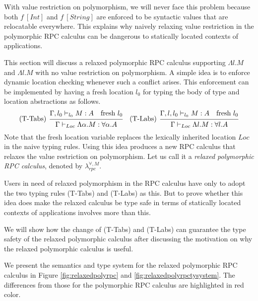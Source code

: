 \documentclass[a4paper]{article}
\theoremstyle{plain}
\theoremstyle{definition}
\newcommand{\polyrpcM}{$\lambda_{rpc}^{\forall,M}$\xspace}
\newcommand{\tyenv}{\Gamma}
\newcommand{\tyenvExtWith}[1]{\Gamma,#1}
\newcommand{\typing}[4]{#1\vdash_{#2} #3 : #4}
\newcommand{\Loc}{Loc}
\begin{document}
%
With value restriction on polymorphism, we will never face this
problem because both $f \ [Int]$ and $f \ [String]$ are enforced to be
syntactic values that are relocatable everywhere.
%
This explains why naively relaxing value restriction in the
polymorphic RPC calculus can be dangerous to statically located
contexts of applications.


%
This section will discuss a relaxed polymorphic RPC calculus
supporting $\Lambda l.M$ and $\Lambda l.M$ with no value restriction
on polymorphism.
%
A simple idea is to enforce dynamic location checking whenever such a
conflict arises.
%
This enforcement can be implemented by having a fresh location $l_0$
for typing the body of type and location abstractions as follows.
%
\[
    \begin{prooftree}
      \hypo{  \typing{\tyenv,l_0}{l_0}{M}{A} \ \ \ \mbox{fresh} \ l_0}
      \infer[left label=(T-Tabs)]1{ \typing{\tyenv}{\Loc}{\Lambda\alpha. M}{\forall\alpha. A}   }
    \end{prooftree}
    \ \ \
    \begin{prooftree}
      \hypo{ \typing{\tyenvExtWith{l},l_0}{l_0}{M}{A}  \ \ \ \mbox{fresh} \ l_0}
      \infer[left label=(T-Labs)]1{ \typing{\tyenv}{\Loc}{\Lambda l. M}{\forall l. A }}
    \end{prooftree}
\]
%
Note that the fresh location variable replaces the lexically inherited
location $\Loc$ in the naive typing rules.
%
Using this idea produces a new RPC calculus that relaxes the value
restriction on polymorphism.
%
Let us call it a {\it relaxed polymorphic RPC calculus}, denoted by \polyrpcM.

%
Users in need of relaxed polymorphism in the RPC calculus have only to
adopt the two typing rules (T-Tabs) and (T-Labs) as this.
%
But to prove whether this idea does make the relaxed calculus be type
safe in terms of statically located contexts of applications involves
more than this.

%
We will show how the change of (T-Tabs) and (T-Labs) can guarantee the
type safety of the relaxed polymorphic calculus after discussing the
motivation on why the relaxed polymorphic calculus is useful.

%
We present the semantics and type system for the relaxed polymorphic
RPC calculus in Figure \ref{fig:relaxedpolyrpc} and
\ref{fig:relaxedpolyrpctysystem}.
%
The differences from those for the polymorphic RPC calculus are
highlighted in red color.
\end{document}
